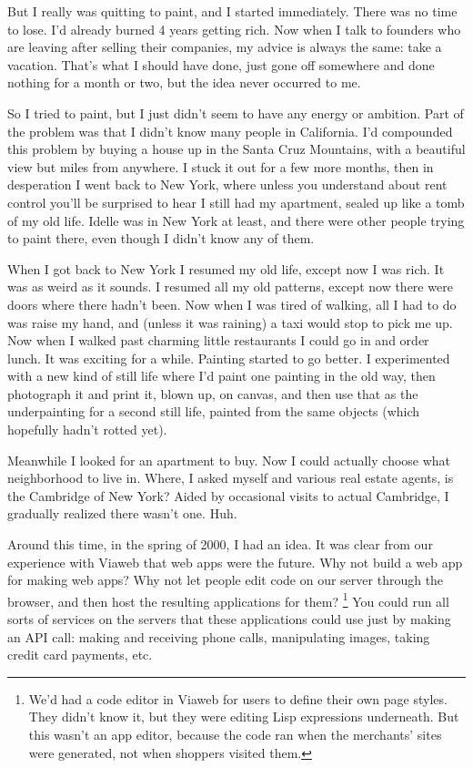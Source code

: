 But I really was quitting to paint, and I started immediately. There was
no time to lose. I'd already burned 4 years getting rich. Now when I
talk to founders who are leaving after selling their companies, my
advice is always the same: take a vacation. That's what I should have
done, just gone off somewhere and done nothing for a month or two, but
the idea never occurred to me.

So I tried to paint, but I just didn't seem to have any energy or
ambition. Part of the problem was that I didn't know many people in
California. I'd compounded this problem by buying a house up in the
Santa Cruz Mountains, with a beautiful view but miles from anywhere. I
stuck it out for a few more months, then in desperation I went back to
New York, where unless you understand about rent control you'll be
surprised to hear I still had my apartment, sealed up like a tomb of my
old life. Idelle was in New York at least, and there were other people
trying to paint there, even though I didn't know any of them.

When I got back to New York I resumed my old life, except now I was
rich. It was as weird as it sounds. I resumed all my old patterns,
except now there were doors where there hadn't been. Now when I was
tired of walking, all I had to do was raise my hand, and (unless it was
raining) a taxi would stop to pick me up. Now when I walked past
charming little restaurants I could go in and order lunch. It was
exciting for a while. Painting started to go better. I experimented with
a new kind of still life where I'd paint one painting in the old way,
then photograph it and print it, blown up, on canvas, and then use that
as the underpainting for a second still life, painted from the same
objects (which hopefully hadn't rotted yet).

Meanwhile I looked for an apartment to buy. Now I could actually choose
what neighborhood to live in. Where, I asked myself and various real
estate agents, is the Cambridge of New York? Aided by occasional visits
to actual Cambridge, I gradually realized there wasn't one. Huh.

Around this time, in the spring of 2000, I had an idea. It was clear
from our experience with Viaweb that web apps were the future. Why not
build a web app for making web apps? Why not let people edit code on our
server through the browser, and then host the resulting applications for
them? \footnote{We'd had a code editor in Viaweb for users to define their own
page styles. They didn't know it, but they were editing Lisp expressions
underneath. But this wasn't an app editor, because the code ran when the
merchants' sites were generated, not when shoppers visited them.} You could run all sorts of services on the
servers that these applications could use just by making an API call:
making and receiving phone calls, manipulating images, taking credit
card payments, etc.

